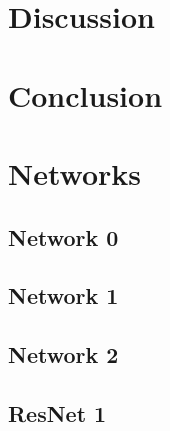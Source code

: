 \documentclass[11pt,twoside]{report}
\begin{document}
\chapter{Discussion}
\chapter{Conclusion}
\appendix
\chapter{Networks}
\section*{Network 0} \label{net:0}
\section*{Network 1}
\section*{Network 2}
\section*{ResNet 1}



\end{document}
